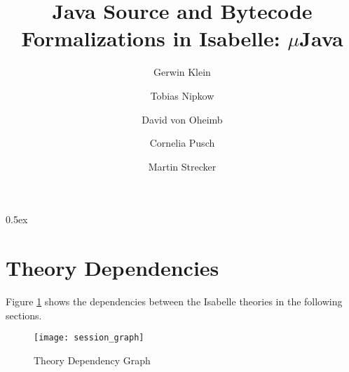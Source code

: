 \documentclass[11pt,a4paper]{book}
\newcommand{\mJava}{$\mu$Java}
\begin{document}
\title{Java Source and Bytecode Formalizations in Isabelle: \mJava\\
}
\author{Gerwin Klein \and Tobias Nipkow \and David von Oheimb \and
  \and Cornelia Pusch \and Martin Strecker}
\maketitle


\tableofcontents
\parindent 0pt \parskip 0.5ex



\section{Theory Dependencies}

Figure \ref{theory-deps} shows the dependencies between 
the Isabelle theories in the following sections.

\begin{figure}[h!t]
\begin{center}
  \texttt{[image: session\_graph]}
\end{center}
\caption{Theory Dependency Graph\label{theory-deps}}
\end{figure}

\newpage


\newpage
\nocite{*}


\end{document}
